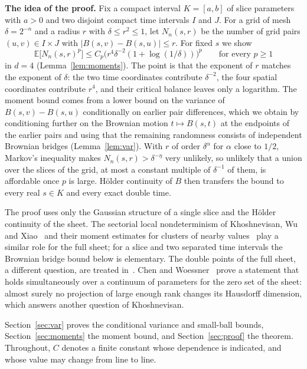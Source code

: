 \documentclass[11pt]{amsart}
\theoremstyle{remark}
\newcommand{\E}{\mathbb{E}}
\begin{document}
\textbf{The idea of the proof.} Fix a compact interval $K=[a,b]$ of slice parameters with $a>0$ and two disjoint
compact time intervals $I$ and $J$. For a grid of mesh $\delta=2^{-n}$ and a radius $r$ with $\delta\le r^2\le1$, let
$N_n(s,r)$ be the number of grid pairs $(u,v)\in I\times J$ with $|B(s,v)-B(s,u)|\le r$. For fixed $s$ we show
\[
\E\bigl[N_n(s,r)^p\bigr]\le C_p\bigl(r^4\delta^{-2}(1+\log(1/\delta))\bigr)^p
\qquad\text{for every }p\ge1
\]
in $d=4$ (Lemma~\ref{lem:moments}). The point is that the exponent of $r$ matches the exponent of $\delta$: the two time
coordinates contribute $\delta^{-2}$, the four spatial coordinates contribute $r^4$, and their critical balance leaves
only a logarithm. The moment bound comes from a lower bound on the variance of $B(s,v)-B(s,u)$ conditionally on earlier
pair differences, which we obtain by conditioning further on the Brownian motion $t\mapsto B(s,t)$ at the endpoints of
the earlier pairs and using that the remaining randomness consists of independent Brownian bridges
(Lemma~\ref{lem:var}). With $r$ of order $\delta^{\alpha}$ for $\alpha$ close to $1/2$, Markov's inequality makes
$N_n(s,r)>\delta^{-\eta}$ very unlikely, so unlikely that a union over the slices of the grid, at most a constant multiple of $\delta^{-1}$ of them, is
affordable once $p$ is large. H\"older continuity of $B$ then transfers the bound to every real $s\in K$ and every exact
double time.

The proof uses only the Gaussian structure of a single slice and the H\"older continuity of the sheet. The sectorial
local nondeterminism of Khoshnevisan, Wu and Xiao~\cite[Lemma~1.1]{KWX06} and their moment estimates for clusters of
nearby values~\cite[Lemma~3.1]{KWX06} play a similar role for the full sheet; for a slice and two separated time
intervals the Brownian bridge bound below is elementary. The double points of the full sheet, a different question, are
treated in~\cite{DKNWX12,DM15}. Chen and Woessner~\cite{CW25} prove a statement that holds simultaneously over a
continuum of parameters for the zero set of the sheet: almost surely no projection of large enough rank changes its
Hausdorff dimension, which answers another question of Khoshnevisan.

Section~\ref{sec:var} proves the conditional variance and small-ball bounds, Section~\ref{sec:moments} the moment bound,
and Section~\ref{sec:proof} the theorem. Throughout, $C$ denotes a finite constant whose dependence is indicated, and
whose value may change from line to line.
\end{document}
